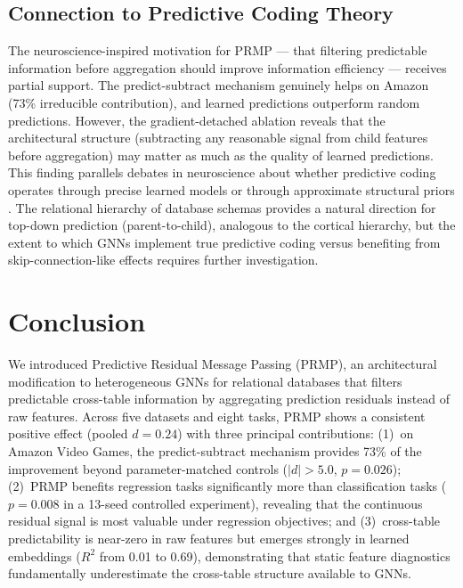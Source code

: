 \documentclass[11pt,letterpaper]{article}
\begin{document}
\subsection{Connection to Predictive Coding Theory}

The neuroscience-inspired motivation for PRMP --- that filtering predictable information before aggregation should improve information efficiency --- receives partial support. The predict-subtract mechanism genuinely helps on Amazon (73\% irreducible contribution), and learned predictions outperform random predictions. However, the gradient-detached ablation reveals that the architectural structure (subtracting any reasonable signal from child features before aggregation) may matter as much as the quality of learned predictions. This finding parallels debates in neuroscience about whether predictive coding operates through precise learned models or through approximate structural priors \citep{Rao1999}. The relational hierarchy of database schemas provides a natural direction for top-down prediction (parent-to-child), analogous to the cortical hierarchy, but the extent to which GNNs implement true predictive coding versus benefiting from skip-connection-like effects requires further investigation.

\section{Conclusion}
\label{sec:conclusion}

We introduced Predictive Residual Message Passing (PRMP), an architectural modification to heterogeneous GNNs for relational databases that filters predictable cross-table information by aggregating prediction residuals instead of raw features. Across five datasets and eight tasks, PRMP shows a consistent positive effect (pooled $d = 0.24$) with three principal contributions: (1)~on Amazon Video Games, the predict-subtract mechanism provides 73\% of the improvement beyond parameter-matched controls ($|d| > 5.0$, $p = 0.026$); (2)~PRMP benefits regression tasks significantly more than classification tasks ($p = 0.008$ in a 13-seed controlled experiment), revealing that the continuous residual signal is most valuable under regression objectives; and (3)~cross-table predictability is near-zero in raw features but emerges strongly in learned embeddings ($R^2$ from 0.01 to 0.69), demonstrating that static feature diagnostics fundamentally underestimate the cross-table structure available to GNNs.
\end{document}
